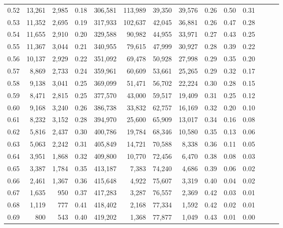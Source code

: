 \begin{tabular}{rrrrrrrrrrrrrr}
0.52 &  13,261 &  2,985 &  0.18 &  306,581 &  113,989 &  39,350 &  39,576 &  0.26 &  0.50 &      0.31 \\
0.53 &  11,352 &  2,695 &  0.19 &  317,933 &  102,637 &  42,045 &  36,881 &  0.26 &  0.47 &      0.28 \\
0.54 &  11,655 &  2,910 &  0.20 &  329,588 &   90,982 &  44,955 &  33,971 &  0.27 &  0.43 &      0.25 \\
0.55 &  11,367 &  3,044 &  0.21 &  340,955 &   79,615 &  47,999 &  30,927 &  0.28 &  0.39 &      0.22 \\
0.56 &  10,137 &  2,929 &  0.22 &  351,092 &   69,478 &  50,928 &  27,998 &  0.29 &  0.35 &      0.20 \\
0.57 &   8,869 &  2,733 &  0.24 &  359,961 &   60,609 &  53,661 &  25,265 &  0.29 &  0.32 &      0.17 \\
0.58 &   9,138 &  3,041 &  0.25 &  369,099 &   51,471 &  56,702 &  22,224 &  0.30 &  0.28 &      0.15 \\
0.59 &   8,471 &  2,815 &  0.25 &  377,570 &   43,000 &  59,517 &  19,409 &  0.31 &  0.25 &      0.12 \\
0.60 &   9,168 &  3,240 &  0.26 &  386,738 &   33,832 &  62,757 &  16,169 &  0.32 &  0.20 &      0.10 \\
0.61 &   8,232 &  3,152 &  0.28 &  394,970 &   25,600 &  65,909 &  13,017 &  0.34 &  0.16 &      0.08 \\
0.62 &   5,816 &  2,437 &  0.30 &  400,786 &   19,784 &  68,346 &  10,580 &  0.35 &  0.13 &      0.06 \\
0.63 &   5,063 &  2,242 &  0.31 &  405,849 &   14,721 &  70,588 &   8,338 &  0.36 &  0.11 &      0.05 \\
0.64 &   3,951 &  1,868 &  0.32 &  409,800 &   10,770 &  72,456 &   6,470 &  0.38 &  0.08 &      0.03 \\
0.65 &   3,387 &  1,784 &  0.35 &  413,187 &    7,383 &  74,240 &   4,686 &  0.39 &  0.06 &      0.02 \\
0.66 &   2,461 &  1,367 &  0.36 &  415,648 &    4,922 &  75,607 &   3,319 &  0.40 &  0.04 &      0.02 \\
0.67 &   1,635 &    950 &  0.37 &  417,283 &    3,287 &  76,557 &   2,369 &  0.42 &  0.03 &      0.01 \\
0.68 &   1,119 &    777 &  0.41 &  418,402 &    2,168 &  77,334 &   1,592 &  0.42 &  0.02 &      0.01 \\
0.69 &     800 &    543 &  0.40 &  419,202 &    1,368 &  77,877 &   1,049 &  0.43 &  0.01 &      0.00 \\

\end{tabular}
